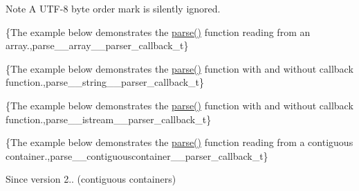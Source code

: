 \begin{DoxyNote}{Note}
A U\+T\+F-\/8 byte order mark is silently ignored.
\end{DoxyNote}
\{The example below demonstrates the {\ttfamily \mbox{\hyperlink{classnlohmann_1_1basic__json_aa9676414f2e36383c4b181fe856aa3c0}{parse()}}} function reading from an array.,parse\+\_\+\+\_\+array\+\_\+\+\_\+parser\+\_\+callback\+\_\+t\}

\{The example below demonstrates the {\ttfamily \mbox{\hyperlink{classnlohmann_1_1basic__json_aa9676414f2e36383c4b181fe856aa3c0}{parse()}}} function with and without callback function.,parse\+\_\+\+\_\+string\+\_\+\+\_\+parser\+\_\+callback\+\_\+t\}

\{The example below demonstrates the {\ttfamily \mbox{\hyperlink{classnlohmann_1_1basic__json_aa9676414f2e36383c4b181fe856aa3c0}{parse()}}} function with and without callback function.,parse\+\_\+\+\_\+istream\+\_\+\+\_\+parser\+\_\+callback\+\_\+t\}

\{The example below demonstrates the {\ttfamily \mbox{\hyperlink{classnlohmann_1_1basic__json_aa9676414f2e36383c4b181fe856aa3c0}{parse()}}} function reading from a contiguous container.,parse\+\_\+\+\_\+contiguouscontainer\+\_\+\+\_\+parser\+\_\+callback\+\_\+t\}

\begin{DoxySince}{Since}
version 2.. (contiguous containers) 
\end{DoxySince}
\mbox{\label{classnlohmann_1_1basic__json_af3501e04d3c7a824bffb05a5a45ba884}} 
